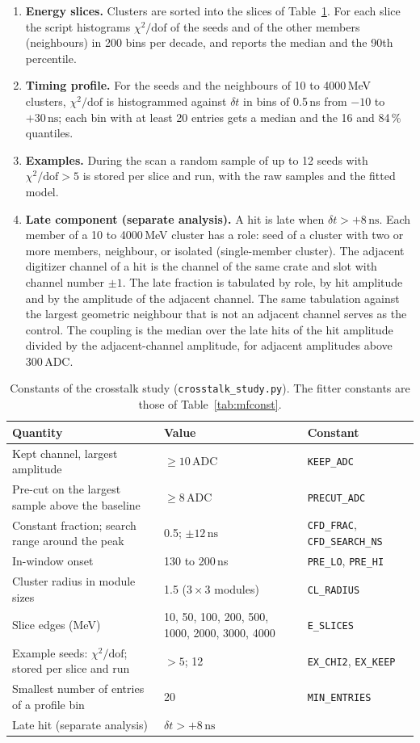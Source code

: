 \documentclass[11pt]{article}
\newcommand{\ns}{\,\mathrm{ns}}
\newcommand{\adc}{\,\mathrm{ADC}}
\newcommand{\code}[1]{\texttt{#1}}
\begin{document}
\begin{enumerate}
\item \textbf{Energy slices.} Clusters are sorted into the slices of Table~\ref{tab:xtalkcuts}. For each slice the script histograms $\chi^2/\mathrm{dof}$ of the seeds and of the other members (neighbours) in 200 bins per decade, and reports the median and the 90th percentile.
\item \textbf{Timing profile.} For the seeds and the neighbours of 10 to 4000\,MeV clusters, $\chi^2/\mathrm{dof}$ is histogrammed against $\delta t$ in bins of 0.5\,ns from $-10$ to $+30\ns$; each bin with at least 20 entries gets a median and the 16 and 84\,\% quantiles.
\item \textbf{Examples.} During the scan a random sample of up to 12 seeds with $\chi^2/\mathrm{dof} > 5$ is stored per slice and run, with the raw samples and the fitted model.
\item \textbf{Late component (separate analysis).} A hit is late when $\delta t > +8\ns$. Each member of a 10 to 4000\,MeV cluster has a role: seed of a cluster with two or more members, neighbour, or isolated (single-member cluster). The adjacent digitizer channel of a hit is the channel of the same crate and slot with channel number $\pm 1$. The late fraction is tabulated by role, by hit amplitude and by the amplitude of the adjacent channel. The same tabulation against the largest geometric neighbour that is not an adjacent channel serves as the control. The coupling is the median over the late hits of the hit amplitude divided by the adjacent-channel amplitude, for adjacent amplitudes above 300\,ADC.
\end{enumerate}

\begin{table}[htbp]
\centering
\caption{Constants of the crosstalk study (\code{crosstalk\_study.py}). The fitter constants are those of Table~\ref{tab:mfconst}.}
\label{tab:xtalkcuts}
\small
\begin{tabular}{lll}
\toprule
Quantity & Value & Constant \\
\midrule
Kept channel, largest amplitude & $\ge 10\adc$ & \code{KEEP\_ADC} \\
Pre-cut on the largest sample above the baseline & $\ge 8\adc$ & \code{PRECUT\_ADC} \\
Constant fraction; search range around the peak & 0.5; $\pm 12\ns$ & \code{CFD\_FRAC}, \code{CFD\_SEARCH\_NS} \\
In-window onset & 130 to 200\,ns & \code{PRE\_LO}, \code{PRE\_HI} \\
Cluster radius in module sizes & 1.5 ($3 \times 3$ modules) & \code{CL\_RADIUS} \\
Slice edges (MeV) & 10, 50, 100, 200, 500, 1000, 2000, 3000, 4000 & \code{E\_SLICES} \\
Example seeds: $\chi^2/\mathrm{dof}$; stored per slice and run & $> 5$; 12 & \code{EX\_CHI2}, \code{EX\_KEEP} \\
Smallest number of entries of a profile bin & 20 & \code{MIN\_ENTRIES} \\
Late hit (separate analysis) & $\delta t > +8\ns$ & \\
\bottomrule
\end{tabular}
\end{table}
\end{document}
